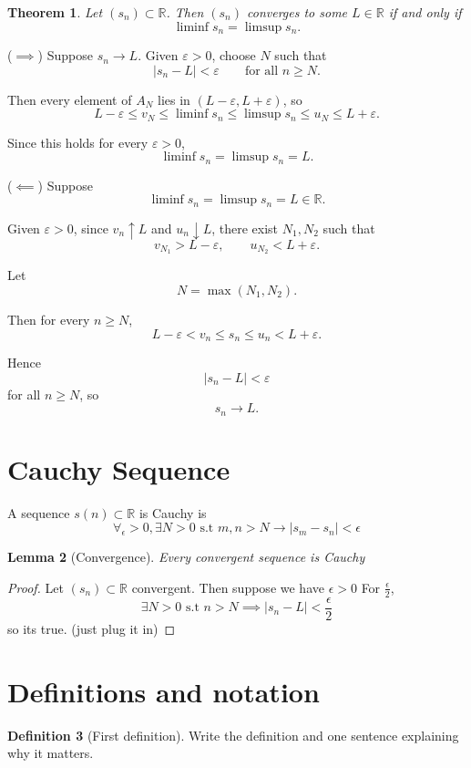 \documentclass[11pt]{article}
\newcommand{\R}{\mathbb{R}}
\newcommand{\1}{\mathbf{1}}
\newcommand{\eps}{\varepsilon}
\newcommand{\abs}[1]{\left\lvert#1\right\rvert}
\theoremstyle{notestyle}
\newtheorem{theorem}{Theorem}[section]
\newtheorem{lemma}[theorem]{Lemma}
\theoremstyle{definition}
\newtheorem{definition}[theorem]{Definition}
\begin{document}
\begin{theorem}
Let $(s_n)\subset\R$. Then $(s_n)$ converges to some $L\in\R$ if and only if
\[
\liminf s_n=\limsup s_n.
\]
\end{theorem}

\par
($\implies$) Suppose $s_n\to L$. Given $\eps>0$, choose $N$ such that
\[
\abs{s_n-L}<\eps
\qquad\text{for all }n\ge N.
\]

Then every element of $A_N$ lies in $(L-\eps,L+\eps)$, so
\[
L-\eps\le v_N\le\liminf s_n
\le\limsup s_n\le u_N\le L+\eps.
\]

Since this holds for every $\eps>0$,
\[
\liminf s_n=\limsup s_n=L.
\]

\par
($\impliedby$) Suppose
\[
\liminf s_n=\limsup s_n=L\in\R.
\]

Given $\eps>0$, since $v_n\uparrow L$ and $u_n\downarrow L$, there exist
$N_1,N_2$ such that
\[
v_{N_1}>L-\eps,
\qquad
u_{N_2}<L+\eps.
\]

Let
\[
N=\max(N_1,N_2).
\]

Then for every $n\ge N$,
\[
L-\eps<v_n\le s_n\le u_n<L+\eps.
\]

Hence
\[
\abs{s_n-L}<\eps
\]
for all $n\ge N$, so
\[
s_n\to L.
\]
\section {Cauchy Sequence}
A sequence $s(n) \subset \mathbb{R}$ is Cauchy is $$\forall_{\epsilon} >0 , \exists N >
0 \text{ s.t } m, n > N \rightarrow |s_m - s_n| < \epsilon $$
\begin{lemma}[Convergence] 
\label{lem:label}
Every convergent sequence is Cauchy
\end{lemma}
\begin{proof}
    Let $(s_n) \subset \mathbb{R} $ convergent.
    Then suppose we have $\epsilon > 0$
    For $\frac{\epsilon}{2}$, $$\exists N > 0 \text{ s.t } n > N \implies |s_n - L| <
    \frac{\epsilon}{2}$$
    so its true. (just plug it in)
\end{proof}
\section{Definitions and notation}

\begin{definition}[First definition]
Write the definition and one sentence explaining why it matters.
\end{definition}
\end{document}
